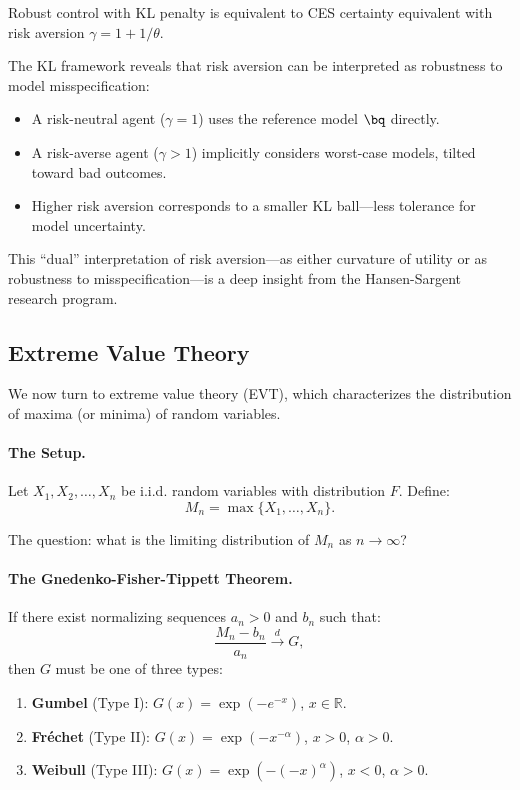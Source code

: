 Robust control with KL penalty is equivalent to CES certainty equivalent with risk aversion $\gamma = 1 + 1/\theta$.

\begin{calloutimportant}
The KL framework reveals that risk aversion can be interpreted as robustness to model misspecification:
\begin{itemize}[nosep]
\item A risk-neutral agent ($\gamma = 1$) uses the reference model $\bq$ directly.
\item A risk-averse agent ($\gamma > 1$) implicitly considers worst-case models, tilted toward bad outcomes.
\item Higher risk aversion corresponds to a smaller KL ball---less tolerance for model uncertainty.
\end{itemize}

This ``dual'' interpretation of risk aversion---as either curvature of utility or as robustness to misspecification---is a deep insight from the Hansen-Sargent research program.
\end{calloutimportant}

\subsection{Extreme Value Theory}
\label{subsec:ac-adv-evt}

We now turn to extreme value theory (EVT), which characterizes the distribution of maxima (or minima) of random variables.

\paragraph{The Setup.}
Let $X_1, X_2, \ldots, X_n$ be i.i.d. random variables with distribution $F$. Define:
\begin{equation}
M_n = \max\{X_1, \ldots, X_n\}.
\label{eq:ac-adv-Mn}
\end{equation}

The question: what is the limiting distribution of $M_n$ as $n \to \infty$?

\paragraph{The Gnedenko-Fisher-Tippett Theorem.}
If there exist normalizing sequences $a_n > 0$ and $b_n$ such that:
\begin{equation}
\frac{M_n - b_n}{a_n} \xrightarrow{d} G,
\label{eq:ac-adv-gft}
\end{equation}
then $G$ must be one of three types:
\begin{enumerate}[label=(\roman*)]
\item \textbf{Gumbel} (Type I): $G(x) = \exp(-e^{-x})$, $x \in \mathbb{R}$.
\item \textbf{Fréchet} (Type II): $G(x) = \exp(-x^{-\alpha})$, $x > 0$, $\alpha > 0$.
\item \textbf{Weibull} (Type III): $G(x) = \exp(-(-x)^{\alpha})$, $x < 0$, $\alpha > 0$.
\end{enumerate}

